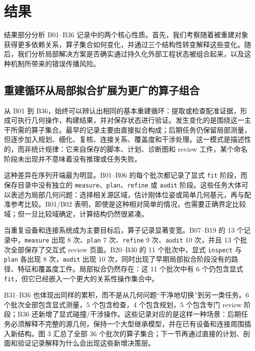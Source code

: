 \documentclass[10pt,a4paper]{article}
\begin{document}
\hypertarget{ux7ed3ux679c}{%
\section{结果}\label{ux7ed3ux679c}}

结果部分分析 B01--B36
记录中的两个核心性质。首先，我们考察随着被重建对象获得更多依赖关系，算子集合如何变化，并通过三个结构性转变解释这些变化。随后，我们分析局部解决方案是否确实通过持久化外部工程状态被组合起来，以及这种机制所带来的错误传播风险。

\hypertarget{ux91cdux5efaux5faaux73afux4eceux5c40ux90e8ux62dfux5408ux6269ux5c55ux4e3aux66f4ux5e7fux7684ux7b97ux5b50ux7ec4ux5408}{%
\subsection{重建循环从局部拟合扩展为更广的算子组合}\label{ux91cdux5efaux5faaux73afux4eceux5c40ux90e8ux62dfux5408ux6269ux5c55ux4e3aux66f4ux5e7fux7684ux7b97ux5b50ux7ec4ux5408}}

从 B01 到
B36，始终可以辨认出相同的基本重建循环：提取或检查配准证据，形成可执行几何操作，构建结果，并对保存状态进行验证。发生变化的是围绕这一主干所需的算子集合。最早的记录主要由直接拟合构成；后期任务仍保留局部测量，但逐步加入规划、细化、复核、连接关系、覆盖度和干涉处理。这一模式是描述性的，而非统计规律：它来自保存的脚本、计划、诊断图和
review 工件，某个命名阶段未出现并不意味着没有推理或任务失败。

这种差异在序列开端最为明显。B01--B06 的每个批次都记录了显式 \texttt{fit}
阶段，而保存目录中没有独立的
\texttt{measure}、\texttt{plan}、\texttt{refine} 或 \texttt{audit}
阶段。这些任务大体可以表述为局部几何问题：选择相关源区域，估计刚体位姿或简单几何基元，再与配准参考比较。B01/B02
表明，即使是这种相对简单的情况，也需要正确界定比较域；但一旦比较域确定，计算结构仍然很紧凑。

当重复设备和连接系统成为主要目标后，算子记录显著变宽。B07--B19 的 13
个记录中，\texttt{measure} 出现 8 次、\texttt{plan} 7
次、\texttt{refine} 9 次、\texttt{audit} 10 次，并且 13
个批次全部保存了交互式 review 页面。B20--B30 的 11 个批次中，显式
\texttt{inspect} 与 \texttt{plan} 各出现 8 次，\texttt{audit} 出现 10
次，同时出现了早期局部拟合阶段没有的路径、特征和覆盖度工件。局部拟合仍然存在：这
11 个批次中有 6 个仍包含显式
\texttt{fit}，但它已经嵌入一个更大的关系性操作集合中。

B31--B36
也体现出同样的累积，而不是从几何问题``干净地切换''到另一类任务。6
个批次全部包含显式测量，5 个包含检查，4 个包含规划，5 个包含专门 review
阶段；B36
还新增了显式碰撞/干涉操作。这些记录对应的是这样一种场景：后期任务必须解释不完整的源几何，保持一个大型继承模型，并在已有设备和连接周围插入新结构。图
3 汇总了全部 36
个批次的算子集合；下一节再通过直接的计划、剖面和验证记录解释为什么会出现这些新增决策层。
\end{document}

